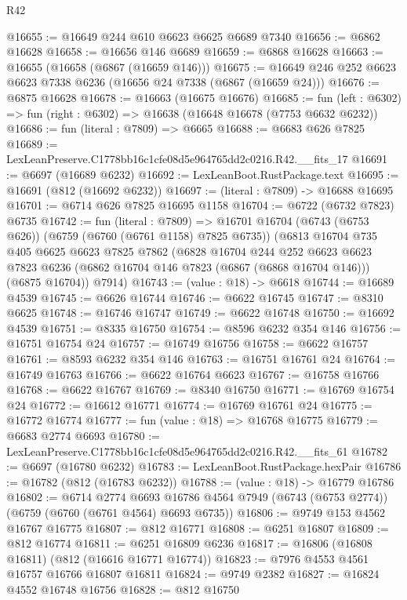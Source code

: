 \begin{lexlean}{R42}
\begin{coremodule}
{@16655 := @16649 @244 @610 @6623 @6625 @6689 @7340
@16656 := @6862 @16628
@16658 := @16656 @146 @6689
@16659 := @6868 @16628
@16663 := @16655 (@16658 (@6867 (@16659 @146)))
@16675 := @16649 @246 @252 @6623 @6623 @7338 @6236 (@16656 @24 @7338 (@6867 (@16659 @24)))
@16676 := @6875 @16628
@16678 := @16663 (@16675 @16676)
@16685 := fun (left : @6302) => fun (right : @6302) => @16638 (@16648 @16678 (@7753 @6632 @6232))
@16686 := fun (literal : @7809) => @6665
@16688 := @6683 @626 @7825
@16689 := LexLeanPreserve.C1778bb16c1cfe08d5e964765dd2c0216.R42.__fits_17
@16691 := @6697 (@16689 @6232)
@16692 := LexLeanBoot.RustPackage.text
@16695 := @16691 (@812 (@16692 @6232))
@16697 := (literal : @7809) -> @16688 @16695
@16701 := @6714 @626 @7825 @16695 @1158
@16704 := @6722 (@6732 @7823) @6735
@16742 := fun (literal : @7809) =>
  @16701
    @16704
    (@6743 (@6753 @626))
    (@6759 (@6760 (@6761 @1158) @7825 @6735))
    (@6813
      @16704
      @735
      @405
      @6625
      @6623
      @7825
      @7862
      (@6828
        @16704
        @244
        @252
        @6623
        @6623
        @7823
        @6236
        (@6862 @16704 @146 @7823 (@6867 (@6868 @16704 @146)))
        (@6875 @16704))
      @7914)
@16743 := (value : @18) -> @6618
@16744 := @16689 @4539
@16745 := @6626 @16744
@16746 := @6622 @16745
@16747 := @8310 @6625
@16748 := @16746 @16747
@16749 := @6622 @16748
@16750 := @16692 @4539
@16751 := @8335 @16750
@16754 := @8596 @6232 @354 @146
@16756 := @16751 @16754 @24
@16757 := @16749 @16756
@16758 := @6622 @16757
@16761 := @8593 @6232 @354 @146
@16763 := @16751 @16761 @24
@16764 := @16749 @16763
@16766 := @6622 @16764 @6623
@16767 := @16758 @16766
@16768 := @6622 @16767
@16769 := @8340 @16750
@16771 := @16769 @16754 @24
@16772 := @16612 @16771
@16774 := @16769 @16761 @24
@16775 := @16772 @16774
@16777 := fun (value : @18) => @16768 @16775
@16779 := @6683 @2774 @6693
@16780 := LexLeanPreserve.C1778bb16c1cfe08d5e964765dd2c0216.R42.__fits_61
@16782 := @6697 (@16780 @6232)
@16783 := LexLeanBoot.RustPackage.hexPair
@16786 := @16782 (@812 (@16783 @6232))
@16788 := (value : @18) -> @16779 @16786
@16802 := @6714
    @2774
    @6693
    @16786
    @4564
    @7949
    (@6743 (@6753 @2774))
    (@6759 (@6760 (@6761 @4564) @6693 @6735))
@16806 := @9749 @153 @4562 @16767 @16775
@16807 := @812 @16771
@16808 := @6251 @16807
@16809 := @812 @16774
@16811 := @6251 @16809 @6236
@16817 := @16806 (@16808 @16811) (@812 (@16616 @16771 @16774))
@16823 := @7976 @4553 @4561 @16757 @16766 @16807 @16811
@16824 := @9749 @2382
@16827 := @16824 @4552 @16748 @16756
@16828 := @812 @16750
}
\end{coremodule}
\end{lexlean}
